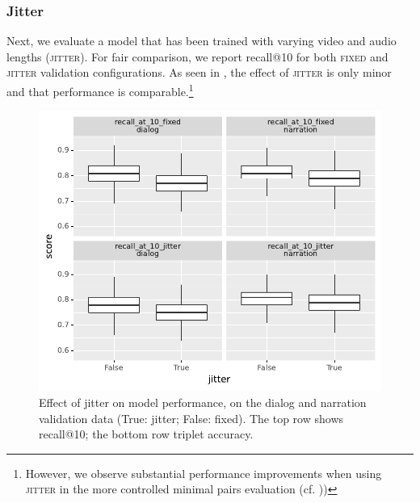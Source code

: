 \subsubsection{Jitter}
Next, we evaluate a model that has been trained with varying video and audio 
lengths (\textsc{jitter}). For fair comparison, we report recall@10 for both 
\textsc{fixed} and \textsc{jitter} validation configurations.
As seen in , the effect of \textsc{jitter} is only
minor and that performance is comparable.\footnote{However, we observe 
substantial performance improvements when using \textsc{jitter} in the more 
controlled minimal pairs evaluation (cf. ))}
\begin{figure}[htb]
	\centering
	\includegraphics[width=\columnwidth]{results/ablations/jitter.pdf}
	\caption{Effect of jitter on model performance, on the dialog
          and narration validation data (True: jitter; False:
          fixed). The top row shows recall@10; the bottom row triplet
          accuracy.}
	\label{fig:jitter}
\end{figure}



